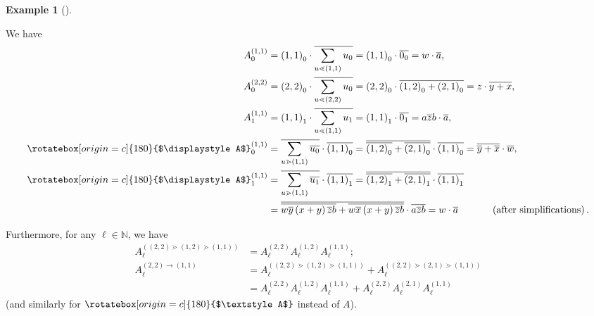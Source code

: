 \documentclass[numbers=enddot,12pt,final,onecolumn,notitlepage]{scrartcl}%
\theoremstyle{definition}
\newtheorem{exam}[theo]{Example}
\newenvironment{example}[1][]
{\begin{exam}[#1]\begin{leftbar}}
{\end{leftbar}\end{exam}}
\newcommand{\upslack}{\mathchoice{\rotatebox[origin=c]{180}{$\displaystyle A$}}{\rotatebox[origin=c]{180}{$\textstyle A$}}{\rotatebox[origin=c]{180}{$\scriptstyle A$}}{\rotatebox[origin=c]{180}{$\scriptscriptstyle A$}}}
\newcommand{\downslack}{A}
\let\sumnonlimits\sum
\renewcommand{\sum}{\sumnonlimits\limits}
\begin{document}
\begin{example}
We have
\begin{align*}
\downslack_{0}^{\left(  1,1\right)  }  &  =\left(  1,1\right)  _{0}%
\cdot\overline{\sum\limits_{u\lessdot\left(  1,1\right)  }u_{0}}=\left(
1,1\right)  _{0}\cdot\overline{0_{0}}=w\cdot\overline{a},\\
\downslack_{0}^{\left(  2,2\right)  }  &  =\left(  2,2\right)  _{0}%
\cdot\overline{\sum\limits_{u\lessdot\left(  2,2\right)  }u_{0}}=\left(
2,2\right)  _{0}\cdot\overline{\left(  1,2\right)  _{0}+\left(  2,1\right)
_{0}}=z\cdot\overline{y+x},\\
\downslack_{1}^{\left(  1,1\right)  }  &  =\left(  1,1\right)  _{1}%
\cdot\overline{\sum\limits_{u\lessdot\left(  1,1\right)  }u_{1}}=\left(
1,1\right)  _{1}\cdot\overline{0_{1}}=a\overline{z}b\cdot\overline{a},\\
\upslack_{0}^{\left(  1,1\right)  }  &  =\overline{\sum\limits_{u\gtrdot
\left(  1,1\right)  }\overline{u_{0}}}\cdot\overline{\left(  1,1\right)  _{0}%
}=\overline{\overline{\left(  1,2\right)  _{0}}+\overline{\left(  2,1\right)
_{0}}}\cdot\overline{\left(  1,1\right)  _{0}}=\overline{\overline
{y}+\overline{x}}\cdot\overline{w},\\
\upslack_{1}^{\left(  1,1\right)  }  &  =\overline{\sum\limits_{u\gtrdot
\left(  1,1\right)  }\overline{u_{1}}}\cdot\overline{\left(  1,1\right)  _{1}%
}=\overline{\overline{\left(  1,2\right)  _{1}}+\overline{\left(  2,1\right)
_{1}}}\cdot\overline{\left(  1,1\right)  _{1}}\\
&  =\overline{\overline{w\overline{y}\left(  x+y\right)  \overline{z}%
b}+\overline{w\overline{x}\left(  x+y\right)  \overline{z}b}}\cdot
\overline{a\overline{z}b}=w\cdot\overline{a}\ \ \ \ \ \ \ \ \ \ \left(
\text{after simplifications}\right)  .
\end{align*}


Furthermore, for any $\ell\in\mathbb{N}$, we have%
\begin{align*}
\downslack_{\ell}^{\left(  \left(  2,2\right)  \gtrdot\left(  1,2\right)
\gtrdot\left(  1,1\right)  \right)  }  &  =\downslack_{\ell}^{\left(
2,2\right)  }\downslack_{\ell}^{\left(  1,2\right)  }\downslack_{\ell
}^{\left(  1,1\right)  };\\
\downslack_{\ell}^{\left(  2,2\right)  \rightarrow\left(  1,1\right)  }  &
=\downslack_{\ell}^{\left(  \left(  2,2\right)  \gtrdot\left(  1,2\right)
\gtrdot\left(  1,1\right)  \right)  }+\downslack_{\ell}^{\left(  \left(
2,2\right)  \gtrdot\left(  2,1\right)  \gtrdot\left(  1,1\right)  \right)  }\\
&  =\downslack_{\ell}^{\left(  2,2\right)  }\downslack_{\ell}^{\left(
1,2\right)  }\downslack_{\ell}^{\left(  1,1\right)  }+\downslack_{\ell
}^{\left(  2,2\right)  }\downslack_{\ell}^{\left(  2,1\right)  }%
\downslack_{\ell}^{\left(  1,1\right)  }%
\end{align*}
(and similarly for $\upslack$ instead of $\downslack$).
\end{example}
\end{document}
